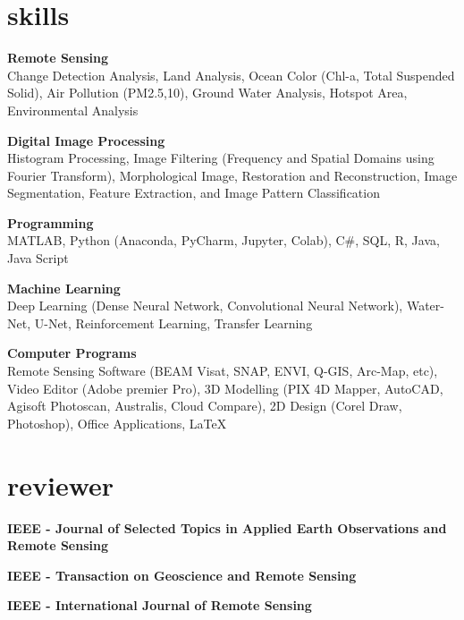 \documentclass[icon]{mycvtemplate}
\begin{document}
\section {skills}
\begin{litemize}
  \begin{litem}
  \textbf{Remote Sensing}\\
  Change Detection Analysis, Land Analysis, Ocean Color (Chl-a, Total Suspended Solid), Air Pollution (PM2.5,10), Ground Water Analysis, Hotspot Area, Environmental Analysis
  \end{litem}

  \begin{litem}
  \textbf{Digital Image Processing}\\
  Histogram Processing, Image Filtering (Frequency and Spatial Domains using Fourier Transform), Morphological Image, Restoration and Reconstruction, Image Segmentation, Feature Extraction, and Image Pattern Classification
  \end{litem}

  \begin{litem}
   \textbf{Programming}\\
   MATLAB, Python (Anaconda, PyCharm, Jupyter, Colab), C\#, SQL, R, Java, Java Script
  \end{litem}

 \begin{litem}
   \textbf{Machine Learning}\\
   Deep Learning (Dense Neural Network, Convolutional Neural Network), Water-Net, U-Net, Reinforcement Learning, Transfer Learning
  \end{litem}

 \begin{litem}
   \textbf{Computer Programs}\\
   	Remote Sensing Software (BEAM Visat, SNAP, ENVI, Q-GIS, Arc-Map, etc), Video Editor (Adobe premier Pro), 3D Modelling (PIX 4D Mapper, AutoCAD, Agisoft Photoscan, Australis, Cloud Compare), 2D Design (Corel Draw, Photoshop), Office Applications, LaTeX
 \end{litem}
\end{litemize}


\section {reviewer}
\begin{litemize}
  \begin{litem}
  \textbf{IEEE - Journal of Selected Topics in Applied Earth Observations and Remote Sensing}
  \end{litem}
  \begin{litem}
  \textbf{IEEE - Transaction on Geoscience and Remote Sensing}
  \end{litem}
  \begin{litem}
  \textbf{IEEE - International Journal of Remote Sensing}
  \end{litem}
\end{litemize}
\end{document}
